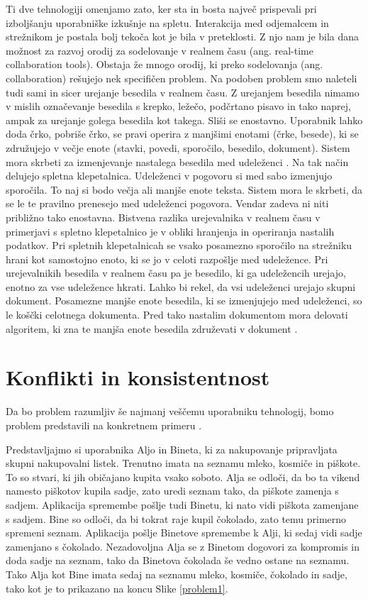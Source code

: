 \documentclass[a4paper, 12pt, twoside]{book}
\begin{document}
Ti dve tehnologiji omenjamo zato, ker sta in bosta največ prispevali pri izboljšanju uporabniške izkušnje na spletu. Interakcija med odjemalcem in strežnikom je postala bolj tekoča kot je bila v preteklosti. Z njo nam je bila dana možnost za razvoj orodij za sodelovanje v realnem času (ang. real-time collaboration tools). Obstaja že mnogo orodij, ki preko sodelovanja (ang. collaboration) rešujejo nek specifičen problem. Na podoben problem smo naleteli tudi sami in sicer urejanje besedila v realnem času. Z urejanjem besedila nimamo v mislih označevanje besedila s krepko, ležečo, podčrtano pisavo in tako naprej, ampak za urejanje golega besedila kot takega. Sliši se enostavno. Uporabnik lahko doda črko, pobriše črko, se pravi operira z manjšimi enotami (črke, besede), ki se združujejo v večje enote (stavki, povedi, sporočilo, besedilo, dokument). Sistem mora skrbeti za izmenjevanje nastalega besedila med udeleženci \cite{gdocs23}. Na tak način delujejo spletna klepetalnica. Udeleženci v pogovoru si med sabo izmenjujo sporočila. To naj si bodo večja ali manjše enote teksta. Sistem mora le skrbeti, da se le te pravilno prenesejo med udeleženci pogovora. Vendar zadeva ni niti približno tako enostavna. Bistvena razlika urejevalnika v realnem času v primerjavi s spletno klepetalnico je v obliki hranjenja in operiranja nastalih podatkov. Pri spletnih klepetalnicah se vsako posamezno sporočilo na strežniku hrani kot samostojno enoto, ki se jo v celoti razpošlje med udeležence. Pri urejevalnikih besedila v realnem času pa je besedilo, ki ga udeležencih urejajo, enotno za vse udeležence hkrati. Lahko bi rekel, da vsi udeleženci urejajo skupni dokument. Posamezne manjše enote besedila, ki se izmenjujejo med udeleženci, so le koščki celotnega dokumenta. Pred tako nastalim dokumentom mora delovati algoritem, ki zna te manjša enote besedila združevati v dokument \cite{gdocs22}.

\section{Konflikti in konsistentnost}

Da bo problem razumljiv še najmanj veščemu uporabniku tehnologij, bomo problem predstavili na konkretnem primeru \cite{problem}.

Predstavljajmo si uporabnika Aljo in Bineta, ki za nakupovanje pripravljata skupni nakupovalni listek. Trenutno imata na seznamu mleko, kosmiče in piškote. To so stvari, ki jih običajano kupita vsako soboto. Alja se odloči, da bo ta vikend namesto piškotov kupila sadje, zato uredi seznam tako, da piškote zamenja s sadjem. Aplikacija spremembe pošlje tudi Binetu, ki nato vidi piškota zamenjane s sadjem. Bine so odloči, da bi tokrat raje kupil čokolado, zato temu primerno spremeni seznam. Aplikacija pošlje Binetove spremembe k Alji, ki sedaj vidi sadje zamenjano s čokolado. Nezadovoljna Alja se z Binetom dogovori za kompromis in doda sadje na seznam, tako da Binetova čokolada še vedno ostane na seznamu. Tako Alja kot Bine imata sedaj na seznamu mleko, kosmiče, čokolado in sadje, tako kot je to prikazano na koncu Slike \ref{problem1}.
\end{document}
